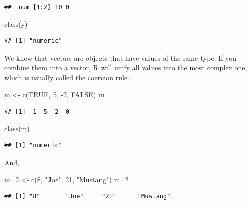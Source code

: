 \documentclass[
]{book}
\newenvironment{Shaded}{\begin{snugshade}}{\end{snugshade}}
\newcommand{\ConstantTok}[1]{\textcolor[rgb]{0.00,0.00,0.00}{#1}}
\newcommand{\DecValTok}[1]{\textcolor[rgb]{0.00,0.00,0.81}{#1}}
\newcommand{\FunctionTok}[1]{\textcolor[rgb]{0.00,0.00,0.00}{#1}}
\newcommand{\NormalTok}[1]{#1}
\newcommand{\OtherTok}[1]{\textcolor[rgb]{0.56,0.35,0.01}{#1}}
\newcommand{\SpecialCharTok}[1]{\textcolor[rgb]{0.00,0.00,0.00}{#1}}
\newcommand{\StringTok}[1]{\textcolor[rgb]{0.31,0.60,0.02}{#1}}
\theoremstyle{definition}
\theoremstyle{definition}
\theoremstyle{definition}
\theoremstyle{definition}
\theoremstyle{remark}
\begin{document}
\begin{verbatim}
##  num [1:2] 10 0
\end{verbatim}

\begin{Shaded}
\begin{Highlighting}[]
\FunctionTok{class}\NormalTok{(y)}
\end{Highlighting}
\end{Shaded}

\begin{verbatim}
## [1] "numeric"
\end{verbatim}

We know that vectors are objects that have values of the same type. If you combine them into a vector, R will unify all values into the most complex one, which is usually called the coercion rule.

\begin{Shaded}
\begin{Highlighting}[]
\NormalTok{m }\OtherTok{\textless{}{-}} \FunctionTok{c}\NormalTok{(}\ConstantTok{TRUE}\NormalTok{, }\DecValTok{5}\NormalTok{, }\SpecialCharTok{{-}}\DecValTok{2}\NormalTok{, }\ConstantTok{FALSE}\NormalTok{)}
\NormalTok{m}
\end{Highlighting}
\end{Shaded}

\begin{verbatim}
## [1]  1  5 -2  0
\end{verbatim}

\begin{Shaded}
\begin{Highlighting}[]
\FunctionTok{class}\NormalTok{(m)}
\end{Highlighting}
\end{Shaded}

\begin{verbatim}
## [1] "numeric"
\end{verbatim}

And,

\begin{Shaded}
\begin{Highlighting}[]
\NormalTok{m\_2 }\OtherTok{\textless{}{-}} \FunctionTok{c}\NormalTok{(}\DecValTok{8}\NormalTok{, }\StringTok{"Joe"}\NormalTok{, }\DecValTok{21}\NormalTok{, }\StringTok{"Mustang"}\NormalTok{)}
\NormalTok{m\_2 }
\end{Highlighting}
\end{Shaded}

\begin{verbatim}
## [1] "8"       "Joe"     "21"      "Mustang"
\end{verbatim}
\end{document}
